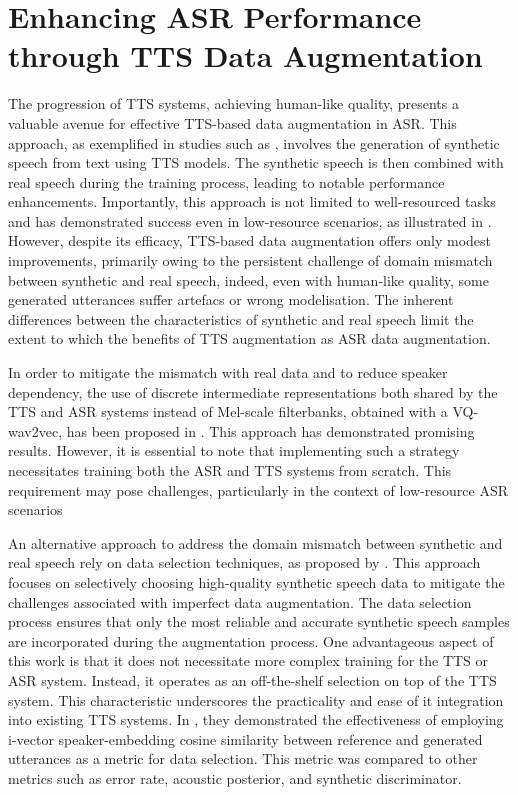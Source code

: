 \section{Enhancing ASR Performance through TTS Data Augmentation}
The progression of \ac{TTS} systems, achieving human-like quality, presents a valuable avenue for effective \ac{TTS}-based data augmentation in \ac{ASR}. This approach, as exemplified in studies such as \cite{laptev2020you}, involves the generation of synthetic speech from text using \ac{TTS} models. The synthetic speech is then combined with real speech during the training process, leading to notable performance enhancements. Importantly, this approach is not limited to well-resourced tasks and has demonstrated success even in low-resource scenarios, as illustrated in \cite{casanova2022asr}. However, despite its efficacy, \ac{TTS}-based data augmentation offers only modest improvements, primarily owing to the persistent challenge of domain mismatch between synthetic and real speech, indeed, even with human-like quality, some generated utterances suffer artefacs or wrong modelisation. The inherent differences between the characteristics of synthetic and real speech limit the extent to which the benefits of \ac{TTS} augmentation as \ac{ASR} data augmentation. 

In order to mitigate the mismatch with real data and to reduce speaker dependency,  the use of discrete intermediate representations both shared by the \ac{TTS} and \ac{ASR} systems instead of Mel-scale filterbanks, obtained with a VQ-wav2vec, has been proposed in \cite{9688218}. This approach has demonstrated promising results. However, it is essential to note that implementing such a strategy necessitates training both the \ac{ASR} and \ac{TTS} systems from scratch. This requirement may pose challenges, particularly in the context of low-resource \ac{ASR} scenarios

An alternative approach to address the domain mismatch between synthetic and real speech rely on data selection techniques, as proposed by \cite{wang2021towards}.  This approach focuses on selectively choosing high-quality synthetic speech data to mitigate the challenges associated with imperfect data augmentation. The data selection process ensures that only the most reliable and accurate synthetic speech samples are incorporated during the augmentation process. One advantageous aspect of this work is that it does not necessitate more complex training for the \ac{TTS} or \ac{ASR} system. Instead, it operates as an off-the-shelf selection on top of the \ac{TTS} system. This characteristic underscores the practicality and ease of it integration into existing \ac{TTS} systems.
In \cite{wang2021towards}, they demonstrated the effectiveness of employing i-vector speaker-embedding cosine similarity between reference and generated utterances as a metric for data selection. This metric was compared to other metrics such as error rate, acoustic posterior, and synthetic discriminator. 

